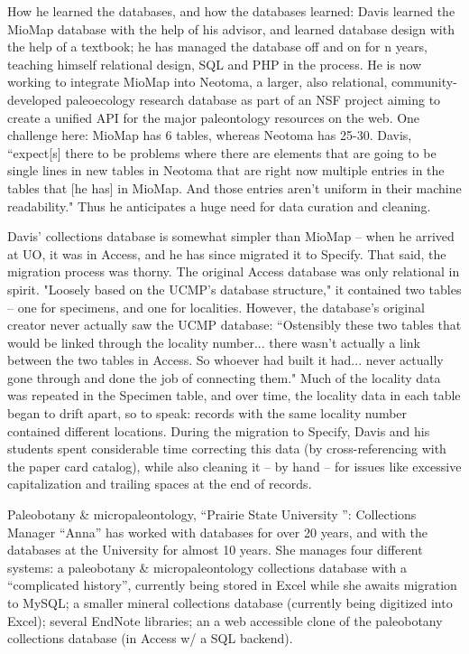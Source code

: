How he learned the databases, and how the databases learned: Davis learned the MioMap database with the help of his advisor, and learned database design with the help of a textbook; he has managed the database off and on for n years, teaching himself relational design, SQL and PHP in the process.  He is now working to integrate MioMap into Neotoma, a larger, also relational, community-developed paleoecology research database as part of an NSF project aiming to create a unified API for the major paleontology resources on the web.  One challenge here: MioMap has 6 tables, whereas Neotoma has 25-30. Davis, “expect[s] there to be problems where there are elements that are going to be single lines in new tables in Neotoma that are right now multiple entries in the tables that [he has] in MioMap. And those entries aren't uniform in their machine readability."  Thus he anticipates a huge need for data curation and cleaning.

Davis’ collections database is somewhat simpler than MioMap – when he arrived at UO, it was in Access, and he has since migrated it to Specify.  That said, the migration process was thorny.  The original Access database was only relational in spirit.  "Loosely based on the UCMP's database structure," it contained two tables – one for specimens, and one for localities. However, the database’s original creator never actually saw the UCMP database:
“Ostensibly these two tables that would be linked through the locality number... there wasn't actually a link between the two tables in Access. So whoever had built it had... never actually gone through and done the job of connecting them."
Much of the locality data was repeated in the Specimen table, and over time, the locality data in each table began to drift apart, so to speak: records with the same locality number contained different locations.  During the migration to Specify, Davis and his students spent considerable time correcting this data (by cross-referencing with the paper card catalog), while also cleaning it – by hand – for issues like excessive capitalization and trailing spaces at the end of records.  

Paleobotany & micropaleontology, “Prairie State University ”: Collections Manager “Anna” has worked with databases for over 20 years, and with the databases at the University for almost 10 years.  She manages four different systems: a paleobotany & micropaleontology collections database with a “complicated history”, currently being stored in Excel while she awaits migration to MySQL; a smaller mineral collections database (currently being digitized into Excel); several EndNote libraries; an a web accessible clone of the paleobotany collections database (in Access w/ a SQL backend).

